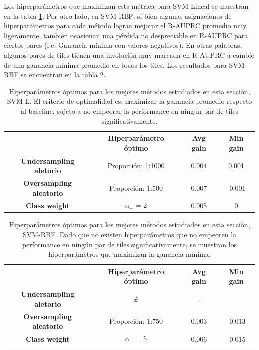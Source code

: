 Los hiperparámetros que maximizan esta métrica para SVM Lineal se muestran en la tabla \ref{tab:best_hyp_svml}. Por otro lado, en SVM RBF, si bien algunas asignaciones de hiperparámetros para cada método logran mejorar el R-AUPRC promedio muy ligeramente, también ocasionan una pérdida no despreciable en R-AUPRC para ciertos pares (i.e. Ganancia mínima con valores negativos). En otras palabras, algunos pares de tiles tienen una involución muy marcada en R-AUPRC a cambio de una ganancia mínima promedio en todos los tiles. Los resultados para SVM RBF se encuentran en la tabla \ref{tab:best_hyp_svmk}.


\begin{table}[ht]
\centering
\begin{tabular}{c|c|c|c|}
\cline{2-4}
\textbf{}                                             & \textbf{Hiperparámetro óptimo} & \textbf{Avg gain} & \textbf{Min gain} \\ \hline
\multicolumn{1}{|c|}{\textbf{Undersampling aletorio}} & Proporción: 1:1000       & 0.004             & 0.001            \\ \hline
\multicolumn{1}{|c|}{\textbf{Oversampling aleatorio}} & Proporción: 1:500        & 0.007             & -0.001            \\ \hline
\multicolumn{1}{|c|}{\textbf{Class weight}}           & $\alpha_+$ = 2           & 0.005             & 0            \\ \hline
\end{tabular}
\caption{Hiperparámetros óptimos para los mejores métodos estudiados en esta sección, SVM-L. El criterio de optimalidad es: maximizar la ganancia promedio respecto al baseline, sujeto a no empeorar la performance en ningún par de tiles significativamente.}
\label{tab:best_hyp_svml}
\end{table}

 
\begin{table}[ht]
\centering
\begin{tabular}{c|c|c|c|}
\cline{2-4}
\textbf{}                                             & \textbf{Hiperparámetro óptimo} & \textbf{Avg gain} & \textbf{Min gain} \\ \hline
\multicolumn{1}{|c|}{\textbf{Undersampling aletorio}} &  $\nexists$       &  -       &  - \\ \hline
\multicolumn{1}{|c|}{\textbf{Oversampling aleatorio}} & Proporción: 1:750        &  0.003       & -0.013 \\ \hline
\multicolumn{1}{|c|}{\textbf{Class weight}}           & $\alpha_+$ = 5    & 0.006     & -0.015             \\ \hline
\end{tabular}
\caption{Hiperparámetros óptimos para los mejores métodos estudiados en esta sección, SVM-RBF. Dado que no existen hiperparámetros que no empeoren la performance en ningún par de tiles significativamente, se muestran los hiperparámetros que maximizan la ganancia mínima. }
\label{tab:best_hyp_svmk}
\end{table}

